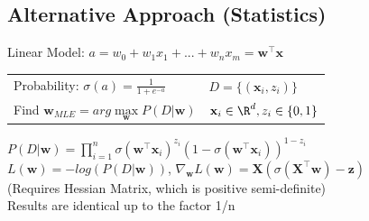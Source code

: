 \documentclass[english]{latex4ei/latex4ei_sheet}
\begin{document}
\begin{sectionbox}
\subsection{Alternative Approach (Statistics)}
Linear Model: $a = w_0+w_1x_1+...+w_nx_m = \mathbf{w}^{\top}\mathbf{x}$\\
\begin{tabular}{ll}
    Probability: $\sigma(a)=\frac{1}{1+e^{-a}}$ & $D=\{(\mathbf{x}_i,z_i)\}$\\
    Find $\mathbf{w}_{MLE}=arg \max\limits_{\mathbf{w}} P(D|\mathbf{w})$ &  $\mathbf{x}_i\in \R^d, z_i\in\{0,1\}$\\
\end{tabular}
$P(D|\mathbf{w})=\prod\limits_{i=1}^n\sigma(\mathbf{w}^{\top}\mathbf{x}_i)^{z_i}(1-\sigma(\mathbf{w}^{\top}\mathbf{x}_i))^{1-z_i}$\\
$L(\mathbf{w})=-log(P(D|\mathbf{w}))$, $\nabla_{\mathbf{w}}L(\mathbf{w})=\mathbf{X}(\sigma(\mathbf{X}^{\top}\mathbf{w})-\mathbf{z})$\\
(Requires Hessian Matrix, which is positive semi-definite)\\
Results are identical up to the factor 1/n
\end{sectionbox}
\end{document}
